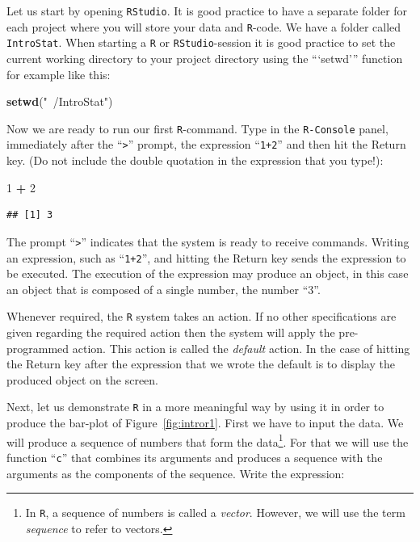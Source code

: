 \documentclass[
]{krantz}
\makeatletter
\newenvironment{Shaded}{\begin{snugshade}}{\end{snugshade}}
\newcommand{\DecValTok}[1]{\textcolor[rgb]{0.00,0.00,0.81}{#1}}
\newcommand{\KeywordTok}[1]{\textcolor[rgb]{0.13,0.29,0.53}{\textbf{#1}}}
\newcommand{\NormalTok}[1]{#1}
\newcommand{\OperatorTok}[1]{\textcolor[rgb]{0.81,0.36,0.00}{\textbf{#1}}}
\newcommand{\StringTok}[1]{\textcolor[rgb]{0.31,0.60,0.02}{#1}}
\newenvironment{kframe}{%
\medskip{}
\setlength{\fboxsep}{.8em}
 \def\at@end@of@kframe{}%
 \ifinner\ifhmode%
  \def\at@end@of@kframe{\end{minipage}}%
  \begin{minipage}{\columnwidth}%
 \fi\fi%
 \def\FrameCommand##1{\hskip\@totalleftmargin \hskip-\fboxsep
 \colorbox{shadecolor}{##1}\hskip-\fboxsep
     \hskip-\linewidth \hskip-\@totalleftmargin \hskip\columnwidth}%
 \MakeFramed {\advance\hsize-\width
   \@totalleftmargin\z@ \linewidth\hsize
   \@setminipage}}%
 {\par\unskip\endMakeFramed%
 \at@end@of@kframe}
\renewenvironment{Shaded}{\begin{kframe}}{\end{kframe}}
\theoremstyle{definition}
\theoremstyle{definition}
\theoremstyle{definition}
\theoremstyle{remark}
\makeatother
\begin{document}
Let us start by opening \texttt{RStudio}. It is good practice to have a separate folder for each project where you will store your data and \texttt{R}-code. We have a folder called \texttt{IntroStat}. When starting a \texttt{R} or \texttt{RStudio}-session it is good practice to set the current working directory to your project directory using the ```setwd''' function for example like this:

\begin{Shaded}
\begin{Highlighting}[]
\KeywordTok{setwd}\NormalTok{(}\StringTok{"~/IntroStat"}\NormalTok{)}
\end{Highlighting}
\end{Shaded}

Now we are ready to run our first \texttt{R}-command. Type in the \texttt{R-Console} panel, immediately after the ``\texttt{\textgreater{}}'' prompt, the expression ``\texttt{1+2}'' and then hit the Return key. (Do not include the double quotation in the expression that you type!):

\begin{Shaded}
\begin{Highlighting}[]
\DecValTok{1} \OperatorTok{+}\StringTok{ }\DecValTok{2}
\end{Highlighting}
\end{Shaded}

\begin{verbatim}
## [1] 3
\end{verbatim}

The prompt ``\texttt{\textgreater{}}'' indicates that the system is ready to receive commands. Writing an expression, such as ``\texttt{1+2}'', and hitting the Return key sends the expression to be executed. The execution of the expression may produce an object, in this case an object that is composed of a single number, the number ``3''.

Whenever required, the \texttt{R} system takes an action. If no other specifications are given regarding the required action then the system will apply the pre-programmed action. This action is called the \emph{default} action. In the case of hitting the Return key after the expression that we wrote the default is to display the produced object on the screen.

Next, let us demonstrate \texttt{R} in a more meaningful way by using it in order to produce the bar-plot of Figure~\ref{fig:intror1}. First we have to input the data. We will produce a sequence of numbers that form the data\footnote{In \texttt{R}, a sequence of numbers is called a \emph{vector}. However, we will use the term \emph{sequence} to refer to vectors.}. For that we will use the function ``\texttt{c}'' that combines its arguments and produces a sequence with the arguments as the components of the sequence. Write the expression:
\end{document}
